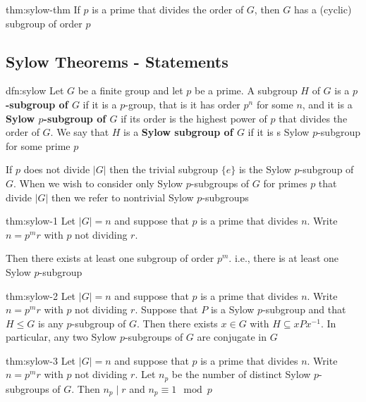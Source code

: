 \documentclass{article}
\begin{document}
\begin{thm}{thm:sylow-thm}{}
    If $p$ is a prime that divides the order of $G$, then $G$ has a (cyclic) subgroup of order $p$
\end{thm}

\subsection{Sylow Theorems - Statements}

\begin{dfn}{dfn:sylow}{}
    Let $G$ be a finite group and let $p$ be a prime. A subgroup $H$ of $G$ is a \textbf{$p$-subgroup of $G$} if it is a $p$-group, that is it has order $p^{n}$ for some $n$, and it is a \textbf{Sylow $p$-subgroup of $G$} if its order is the highest power of $p$ that divides the order of $G$. We say that $H$ is a \textbf{Sylow subgroup of $G$} if it is s Sylow $p$-subgroup for some prime $p$
\end{dfn}

If $p$ does not divide $\lvert G \rvert$ then the trivial subgroup $\{e\}$ is the Sylow $p$-subgroup of $G$. When we wish to consider only Sylow $p$-subgroups of $G$ for primes $p$ that divide $\lvert G \rvert$ then we refer to nontrivial Sylow $p$-subgroups

\begin{thm}[Sylow I]{thm:sylow-1}{}
    Let $\lvert G \rvert = n$ and suppose that $p$ is a prime that divides $n$. Write $n = p^{m}r$ with $p$ not dividing $r$.

    Then there exists at least one subgroup of order $p^{m}$. i.e., there is at least one Sylow $p$-subgroup
\end{thm}

\begin{thm}[Sylow II]{thm:sylow-2}{}
    Let $\lvert G \rvert = n$ and suppose that $p$ is a prime that divides $n$. Write $n = p^{m}r$ with $p$ not dividing $r$. Suppose that $P$ is a Sylow $p$-subgroup and that $H \le G$ is any $p$-subgroup of $G$. Then there exists $x\in G$ with $H \subseteq xPx^{-1}$. In particular, any two Sylow $p$-subgroups of $G$ are conjugate in $G$
\end{thm}

\begin{thm}{thm:sylow-3}{}
    Let $\lvert G \rvert = n$ and suppose that $p$ is a prime that divides $n$. Write $n = p^{m}r$ with $p$ not dividing $r$. Let $n_{p}$ be the number of distinct Sylow $p$-subgroups of $G$. Then $n_{p}\mid r$ and $n_{p} \equiv 1 \mod p$
\end{thm}
\end{document}
